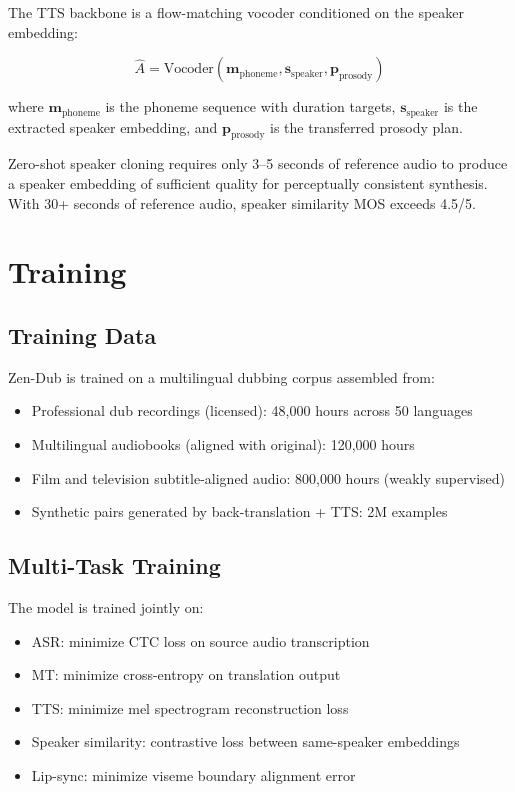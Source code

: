 \documentclass[11pt,a4paper]{article}
\begin{document}
The TTS backbone is a flow-matching vocoder conditioned on the speaker embedding:

\begin{equation}
\hat{A} = \text{Vocoder}\!\left(\mathbf{m}_{\text{phoneme}}, \mathbf{s}_{\text{speaker}}, \mathbf{p}_{\text{prosody}}\right)
\end{equation}

where $\mathbf{m}_{\text{phoneme}}$ is the phoneme sequence with duration targets,
$\mathbf{s}_{\text{speaker}}$ is the extracted speaker embedding, and $\mathbf{p}_{\text{prosody}}$
is the transferred prosody plan.

Zero-shot speaker cloning requires only 3--5 seconds of reference audio to produce
a speaker embedding of sufficient quality for perceptually consistent synthesis.
With 30+ seconds of reference audio, speaker similarity MOS exceeds 4.5/5.

\section{Training}
\label{sec:training}

\subsection{Training Data}

Zen-Dub is trained on a multilingual dubbing corpus assembled from:
\begin{itemize}
\item Professional dub recordings (licensed): 48,000 hours across 50 languages
\item Multilingual audiobooks (aligned with original): 120,000 hours
\item Film and television subtitle-aligned audio: 800,000 hours (weakly supervised)
\item Synthetic pairs generated by back-translation + TTS: 2M examples
\end{itemize}

\subsection{Multi-Task Training}

The model is trained jointly on:
\begin{itemize}
\item ASR: minimize CTC loss on source audio transcription
\item MT: minimize cross-entropy on translation output
\item TTS: minimize mel spectrogram reconstruction loss
\item Speaker similarity: contrastive loss between same-speaker embeddings
\item Lip-sync: minimize viseme boundary alignment error
\end{itemize}
\end{document}
